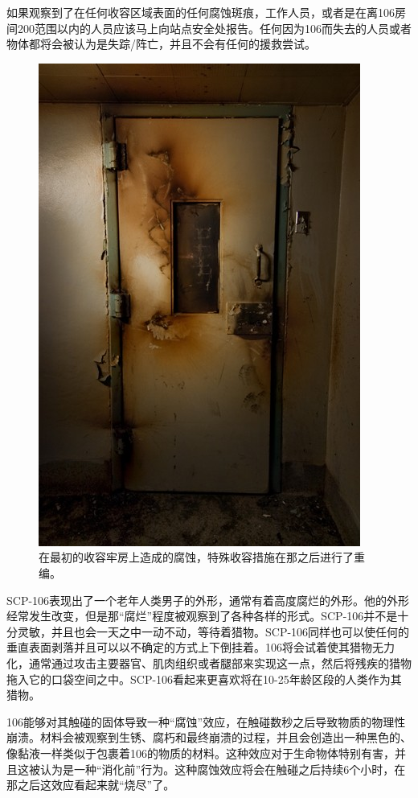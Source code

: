 如果观察到了在任何收容区域表面的任何腐蚀斑痕，工作人员，或者是在离106房间200范围以内的人员应该马上向站点安全处报告。任何因为106而失去的人员或者物体都将会被认为是失踪\slash 阵亡，并且不会有任何的援救尝试。




\begin{figure}[H]
    \centering
    \includegraphics[width=0.5\linewidth]{images/SCP-106-2.jpg}
    \caption*{在最初的收容牢房上造成的腐蚀，特殊收容措施在那之后进行了重编。}
\end{figure}

SCP-106表现出了一个老年人类男子的外形，通常有着高度腐烂的外形。他的外形经常发生改变，但是那“腐烂”程度被观察到了各种各样的形式。SCP-106并不是十分灵敏，并且也会一天之中一动不动，等待着猎物。SCP-106同样也可以使任何的垂直表面剥落并且可以以不确定的方式上下倒挂着。106将会试着使其猎物无力化，通常通过攻击主要器官、肌肉组织或者腿部来实现这一点，然后将残疾的猎物拖入它的口袋空间之中。SCP-106看起来更喜欢将在10-25年龄区段的人类作为其猎物。

106能够对其触碰的固体导致一种“腐蚀”效应，在触碰数秒之后导致物质的物理性崩溃。材料会被观察到生锈、腐朽和最终崩溃的过程，并且会创造出一种黑色的、像黏液一样类似于包裹着106的物质的材料。这种效应对于生命物体特别有害，并且这被认为是一种“消化前”行为。这种腐蚀效应将会在触碰之后持续6个小时，在那之后这效应看起来就“烧尽”了。

